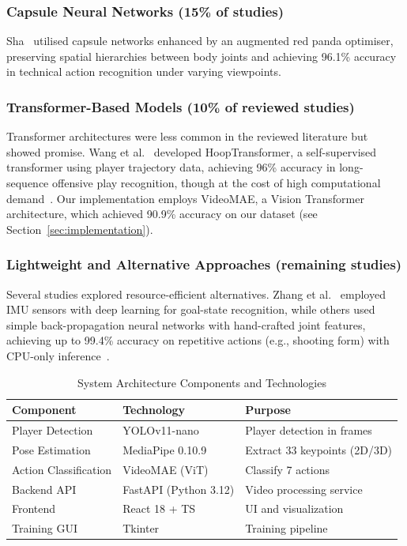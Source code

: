 \documentclass[conference]{IEEEtran}
\begin{document}
\subsubsection{Capsule Neural Networks (15\% of studies)}
Sha~\cite{sha2025capsnet} utilised capsule networks enhanced by an augmented red panda optimiser, preserving spatial hierarchies between body joints and achieving 96.1\% accuracy in technical action recognition under varying viewpoints.

\subsubsection{Transformer-Based Models (10\% of reviewed studies)}
Transformer architectures were less common in the reviewed literature but showed promise. Wang et al.~\cite{wang2024hoop} developed HoopTransformer, a self-supervised transformer using player trajectory data, achieving 96\% accuracy in long-sequence offensive play recognition, though at the cost of high computational demand~\cite{yan2024xgboost,wang2022explainable}. Our implementation employs VideoMAE, a Vision Transformer architecture, which achieved 90.9\% accuracy on our dataset (see Section~\ref{sec:implementation}).

\subsubsection{Lightweight and Alternative Approaches (remaining studies)}
Several studies explored resource-efficient alternatives. Zhang et al.~\cite{zhang2025sensor} employed IMU sensors with deep learning for goal-state recognition, while others used simple back-propagation neural networks with hand-crafted joint features, achieving up to 99.4\% accuracy on repetitive actions (e.g., shooting form) with CPU-only inference~\cite{libin2025personalized,yang2020training,song2022dribbling,stacked2025ensemble,ding2025thermal,li2021shooting}.

\begin{table}[t]
\caption{System Architecture Components and Technologies}
\centering
\footnotesize
\begin{tabular}{p{2.0cm}p{2.5cm}p{3.0cm}}
\toprule
\textbf{Component} & \textbf{Technology} & \textbf{Purpose} \\
\midrule
Player Detection & YOLOv11-nano & Player detection in frames \\
\midrule
Pose Estimation & MediaPipe 0.10.9 & Extract 33 keypoints (2D/3D) \\
\midrule
Action Classification & VideoMAE (ViT) & Classify 7 actions \\
\midrule
Backend API & FastAPI (Python 3.12) & Video processing service \\
\midrule
Frontend & React 18 + TS & UI and visualization \\
\midrule
Training GUI & Tkinter & Training pipeline \\
\bottomrule
\end{tabular}
\label{tab:comparison}
\end{table}
\end{document}
